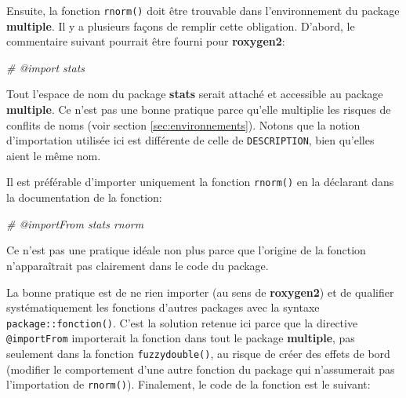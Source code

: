 \documentclass[
  11pt,
  french,
  a4paper,
  extrafontsizes,onecolumn,openright
  ]{memoir}
\newenvironment{Shaded}{\begin{snugshade}}{\end{snugshade}}
\newcommand{\CommentTok}[1]{\textcolor[rgb]{0.56,0.35,0.01}{\textit{#1}}}
\begin{document}
Ensuite, la fonction \texttt{rnorm()} doit être trouvable dans l'environnement du package \textbf{multiple}.
Il y a plusieurs façons de remplir cette obligation.
D'abord, le commentaire suivant pourrait être fourni pour \textbf{roxygen2}:

\scriptsize

\begin{Shaded}
\begin{Highlighting}[]
\CommentTok{\#\textquotesingle{} @import stats}
\end{Highlighting}
\end{Shaded}

\normalsize

Tout l'espace de nom du package \textbf{stats} serait attaché et accessible au package \textbf{multiple}.
Ce n'est pas une bonne pratique parce qu'elle multiplie les risques de conflits de noms (voir section \ref{sec:environnements}).
Notons que la notion d'importation utilisée ici est différente de celle de \texttt{DESCRIPTION}, bien qu'elles aient le même nom.

Il est préférable d'importer uniquement la fonction \texttt{rnorm()} en la déclarant dans la documentation de la fonction:

\scriptsize

\begin{Shaded}
\begin{Highlighting}[]
\CommentTok{\#\textquotesingle{} @importFrom stats rnorm}
\end{Highlighting}
\end{Shaded}

\normalsize

Ce n'est pas une pratique idéale non plus parce que l'origine de la fonction n'apparaîtrait pas clairement dans le code du package.

La bonne pratique est de ne rien importer (au sens de \textbf{roxygen2}) et de qualifier systématiquement les fonctions d'autres packages avec la syntaxe \texttt{package::fonction()}.
C'est la solution retenue ici parce que la directive \texttt{@importFrom} importerait la fonction dans tout le package \textbf{multiple}, pas seulement dans la fonction \texttt{fuzzydouble()}, au risque de créer des effets de bord (modifier le comportement d'une autre fonction du package qui n'assumerait pas l'importation de \texttt{rnorm()}).
Finalement, le code de la fonction est le suivant:

\scriptsize
\end{document}
